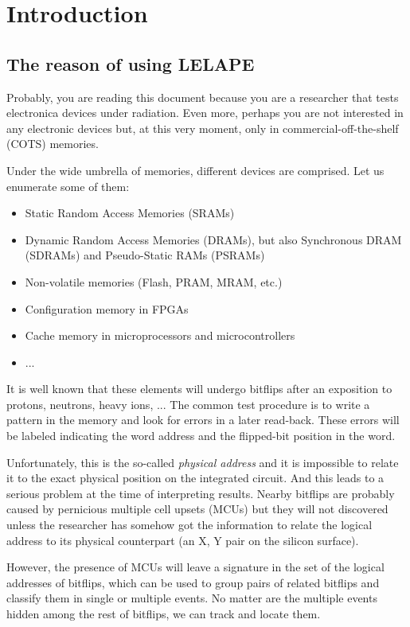 \chapter{Introduction}
%
\section{The reason of using LELAPE}
Probably, you are reading this document because you are a researcher that tests electronica devices under radiation. Even more, perhaps you are not interested in any electronic devices but, at this very moment, only in commercial-off-the-shelf (COTS) memories. 

Under the wide umbrella of memories, different devices are comprised. Let us enumerate some of them:
%
\begin{itemize}
	\item Static Random Access Memories (SRAMs)
	\item Dynamic Random Access Memories (DRAMs), but also Synchronous DRAM (SDRAMs) and Pseudo-Static RAMs (PSRAMs)
	\item Non-volatile memories (Flash, PRAM, MRAM, etc.)
	\item Configuration memory in FPGAs
	\item Cache memory in microprocessors and microcontrollers
	\item ...
\end{itemize}
%
It is well known that these elements will undergo bitflips after an exposition to protons, neutrons, heavy ions, ... The common test procedure is to write a pattern in the memory and look for errors in a later  read-back. These errors will be labeled indicating the word address and the flipped-bit position in the word. 

Unfortunately, this is the so-called \textit{physical address} and it is impossible to relate it to the exact physical position on the integrated circuit. And this leads to a serious problem at the time of interpreting results. Nearby bitflips are probably caused by pernicious multiple cell upsets (MCUs) but they will not discovered unless the researcher has somehow got the information to relate the logical address to its physical counterpart (an X, Y pair on the silicon surface).

However, the presence of MCUs will leave a signature in the set of the logical addresses of bitflips, which can be used to group pairs of related bitflips and classify them in single or multiple events. No matter are the multiple events hidden among the rest of bitflips, we can track and locate them.

